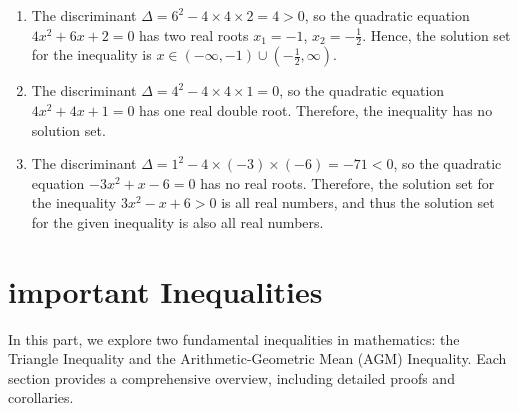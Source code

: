 \documentclass[
	12pt, %
	fleqn, %
	a4paper, %
]{LegrandOrangeBook}
\begin{document}
\begin{enumerate}
    \item The discriminant \(\Delta = 6^2 - 4 \times 4 \times 2 = 4 > 0\), so the quadratic equation \(4x^2 + 6x + 2 = 0\) has two real roots \(x_1 = -1\), \(x_2 = -\frac{1}{2}\).
    Hence, the solution set for the inequality is \(x \in \left(-\infty, -1\right) \cup \left(-\frac{1}{2}, \infty\right)\).

    \item The discriminant \(\Delta = 4^2 - 4 \times 4 \times 1 = 0\), so the quadratic equation \(4x^2 + 4x + 1 = 0\) has one real double root. Therefore, the inequality has no solution set.

    \item The discriminant \(\Delta = 1^2 - 4 \times (-3) \times (-6) = -71 < 0\), so the quadratic equation \(-3x^2 + x - 6 = 0\) has no real roots.
    Therefore, the solution set for the inequality \(3x^2 - x + 6 > 0\) is all real numbers, and thus the solution set for the given inequality is also all real numbers.
\end{enumerate}

\section{important Inequalities}
In this part, we explore two fundamental inequalities in mathematics: the Triangle Inequality and the Arithmetic-Geometric Mean (AGM) Inequality. Each section provides a comprehensive overview, including detailed proofs and corollaries.
\end{document}
